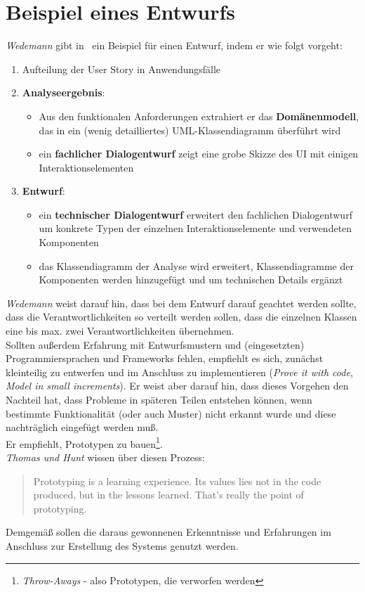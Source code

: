\section{Beispiel eines Entwurfs}
\textit{Wedemann} gibt in~\cite[63 ff.]{Wed09b} ein Beispiel für einen Entwurf, indem er wie folgt vorgeht:

\begin{enumerate}
    \item Aufteilung der User Story in Anwendungsfälle
    \item \textbf{Analyseergebnis}:
    \begin{itemize}
        \item  Aus den funktionalen Anforderungen extrahiert er das \textbf{Domänenmodell}, das in ein (wenig detailliertes) UML-Klassendiagramm überführt wird
        \item  ein \textbf{fachlicher Dialogentwurf} zeigt eine grobe Skizze des UI mit einigen Interaktionselementen
    \end{itemize}
    \item \textbf{Entwurf}:
    \begin{itemize}
        \item ein \textbf{technischer Dialogentwurf} erweitert den fachlichen Dialogentwurf um konkrete Typen der einzelnen Interaktionselemente und verwendeten Komponenten
        \item das Klassendiagramm der Analyse wird erweitert, Klassendiagramme der Komponenten werden hinzugefügt und um technischen Details ergänzt
    \end{itemize}
\end{enumerate}

\noindent
\textit{Wedemann} weist darauf hin, dass bei dem Entwurf darauf geachtet werden sollte, dass die Verantwortlichkeiten so verteilt werden sollen, dass die einzelnen Klassen eine bis max. zwei Verantwortlichkeiten übernehmen.\\

\noindent
Sollten außerdem Erfahrung mit Entwurfsmustern und (eingesetzten) Programmiersprachen und Frameworks fehlen, empfiehlt es sich, zunächst kleinteilig zu entwerfen und im Anschluss zu implementieren (\textit{Prove it with code}, \textit{Model in small increments}).
Er weist aber darauf hin, dass dieses Vorgehen den Nachteil hat, dass Probleme in späteren Teilen entstehen können, wenn bestimmte Funktionalität (oder auch Muster) nicht erkannt wurde und diese nachträglich eingefügt werden muß.\\
Er empfiehlt, Prototypen zu bauen\footnote{
    \textit{Throw-Aways} - also Prototypen, die verworfen werden
}.\\
\textit{Thomas und Hunt} wissen über diesen Prozess:

\blockquote[{\cite[57]{TH19}}]{
Prototyping is a learning experience. Its values lies not in the code produced, but in the lessons learned. That's really the point of prototyping.
}

\noindent
Demgemäß sollen die daraus gewonnenen Erkenntnisse und Erfahrungen im Anschluss zur Erstellung des Systems genutzt werden.
